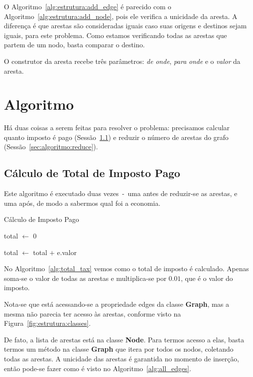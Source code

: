 \documentclass[12pt]{article}
\begin{document}
O Algoritmo~\ref{alg:estrutura:add_edge} é
parecido com o Algoritmo~\ref{alg:estrutura:add_node}, pois ele verifica a unicidade da
aresta. A diferença é que arestas são consideradas iguais caso suas origens e
destinos sejam iguais, para este problema. Como estamos verificando todas as
arestas que partem de um nodo, basta comparar o destino.

O construtor da aresta recebe três parâmetros: \textit{de onde}, \textit{para
  onde} e o \textit{valor} da aresta.

\section{Algoritmo}\label{sec:algoritmo}

Há duas coisas a serem feitas para resolver o problema: precisamos calcular
quanto imposto é pago (Sessão~\ref{sec:algoritmo:total_tax}) e reduzir o número
de arestas do grafo (Sessão~\ref{sec:algoritmo:reduce}).

\subsection{Cálculo de Total de Imposto Pago}\label{sec:algoritmo:total_tax}

Este algoritmo é executado duas vezes~-~uma antes de reduzir-se as arestas, e
uma após, de modo a sabermos qual foi a economia.

\begin{algorithm}[H]
  \caption{Cálculo de Imposto Pago}
  \label{alg:total_tax}
  total $\gets$ $0$

  {
    total $\gets$ total $+$ e.valor
  }
\end{algorithm}

No Algoritmo~\ref{alg:total_tax} vemos como o total de imposto é
calculado. Apenas soma-se o valor de todas as arestas e multiplica-se por
$0.01$, que é o valor do imposto.

Nota-se que está acessando-se a propriedade \textsf{edges} da classe
\textsf{\textbf{Graph}}, mas a mesma não parecia ter acesso às arestas, conforme
visto na Figura~\ref{fig:estrutura:classes}.

De fato, a lista de arestas está na classe \textsf{\textbf{Node}}. Para termos
acesso a elas, basta termos um método na classe \textsf{\textbf{Graph}} que
itera por todos os nodos, coletando todas as arestas. A unicidade das arestas é
garantida no momento de inserção, então pode-se fazer como é visto no Algoritmo~\ref{alg:all_edges}.
\end{document}
